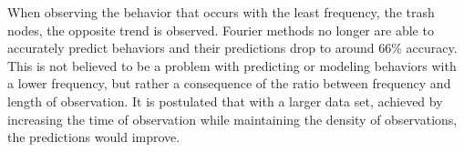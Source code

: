 \begin{table}[h!]
  \centering
  \caption{Hallway Meal Section 1}
\end{table}


When observing the behavior that occurs with the least frequency, the trash
nodes, the opposite trend is observed. Fourier methods no longer are able to
accurately predict behaviors and their predictions drop to around 66\% accuracy.
This is not believed to be a problem with predicting or modeling behaviors with a
lower frequency, but rather a consequence of the ratio between frequency and
length of observation. It is postulated that
with a larger data set, achieved by increasing the time of observation while
maintaining the density of observations, the predictions would improve. \\

